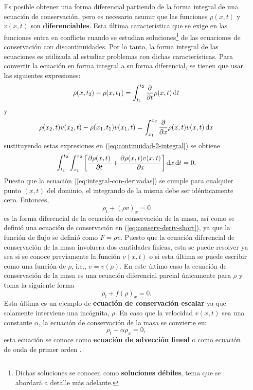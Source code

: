 Es posible obtener una forma diferencial partiendo de la forma integral de una ecuación de conservación, pero es necesario asumir que las funciones $\rho(x,t)$ y $v(x,t)$ son \textbf{diferenciables}. Esta última característica que se exige en las funciones entra en conflicto cuando se estudian soluciones\footnote{Dichas soluciones se conocen como \textbf{soluciones débiles}, tema que se abordará a detalle más adelante.} de las ecuaciones de conservación con discontinuidades. Por lo tanto, la forma integral de las ecuaciones es utilizada al estudiar problemas con dichas características. Para convertir la ecuación en forma integral a su forma diferencial, se tienen que usar las siguientes expresiones:
\begin{equation}
	\rho(x,t_2)-\rho(x,t_1) = \int_{t_1}^{t_2}\pdv{t}\rho(x,t)\dd{t}
\end{equation}
y
\begin{equation}
	\rho(x_2,t)v(x_2,t)-\rho(x_1,t_1)v(x_1,t) = \int_{x_1}^{x_2}\pdv{x}\rho(x,t)v(x,t)\dd{x}
\end{equation}
sustituyendo estas expresiones en (\ref{eq:continuidad-2-integral}) se obtiene
\begin{equation}
	\int_{t_1}^{t_2}\int_{x_1}^{x_2}\left[\pdv{\rho(x,t)}{t} + \pdv{\rho(x,t)v(x,t)}{x}\right]\dd{x}\dd{t} = 0.
	\label{eq:integral-con-derivadas}
\end{equation}
Puesto que la ecuación (\ref{eq:integral-con-derivadas}) se cumple para cualquier punto $(x,t)$ del dominio, el integrando de la misma debe ser idénticamente cero. Entonces,
\begin{equation}
	\rho_{t} + (\rho v)_{x} = 0
\end{equation}
es la forma diferencial de la ecuación de conservación de la masa, así como se definió una ecuación de conservación en (\ref{eq:conserv-deriv-short}), ya que la función de flujo se definió como $F = \rho v$. Puesto que la ecuación diferencial de conservación de la masa involucra dos cantidades físicas, esta se puede resolver ya sea si se conoce previamente la función $v(x,t)$ o si esta última se puede escribir como una función de $\rho$, i.e., $v=v(\rho)$. En este último caso la ecuación de conservación de la masa es una ecuación diferencial parcial únicamente para $\rho$ y toma la siguiente forma
\begin{equation}
	\rho_t + f(\rho)_x = 0.
\end{equation}
Esta última es un ejemplo de \textbf{ecuación de conservación escalar} ya que solamente interviene una incógnita, $\rho$.
En caso que la velocidad $v(x,t)$ sea una constante $\alpha$, la ecuación de conservación de la masa se convierte en:
\begin{equation}
	\rho_t + \alpha\rho_x = 0,
	\label{eq:adveccion}
\end{equation}
esta ecuación se conoce como \textbf{ecuación de advección lineal} o como ecuación de onda de primer orden \cite{heattransfer}.
